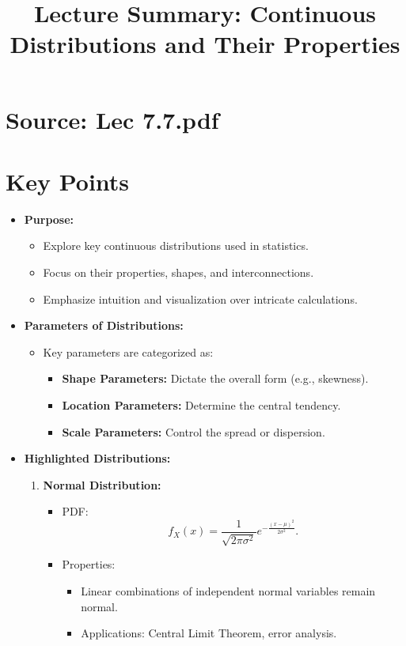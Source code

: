 \documentclass{article}
\title{Lecture Summary: Continuous Distributions and Their Properties}
\author{}
\date{}
\begin{document}
\maketitle

\section*{Source: Lec 7.7.pdf}

\section*{Key Points}

\begin{itemize}
  \item \textbf{Purpose:}
    \begin{itemize}
      \item Explore key continuous distributions used in statistics.
      \item Focus on their properties, shapes, and interconnections.
      \item Emphasize intuition and visualization over intricate calculations.
    \end{itemize}

  \item \textbf{Parameters of Distributions:}
    \begin{itemize}
      \item Key parameters are categorized as:
        \begin{itemize}
          \item \textbf{Shape Parameters:} Dictate the overall form (e.g., skewness).
          \item \textbf{Location Parameters:} Determine the central tendency.
          \item \textbf{Scale Parameters:} Control the spread or dispersion.
        \end{itemize}
    \end{itemize}

  \item \textbf{Highlighted Distributions:}
    \begin{enumerate}
      \item \textbf{Normal Distribution:}
        \begin{itemize}
          \item PDF:
            \[
              f_X(x) = \frac{1}{\sqrt{2\pi\sigma^2}} e^{-\frac{(x-\mu)^2}{2\sigma^2}}.
            \]
          \item Properties:
            \begin{itemize}
              \item Linear combinations of independent normal variables remain normal.
              \item Applications: Central Limit Theorem, error analysis.
            \end{itemize}
        \end{itemize}


\end{enumerate}
\end{itemize}
\end{document}
